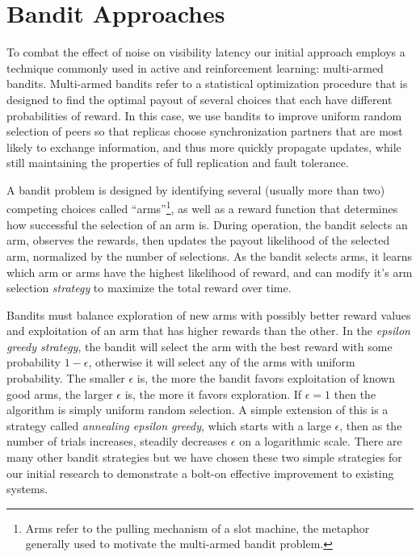 \section{Bandit Approaches}

To combat the effect of noise on visibility latency our initial approach
employs a technique commonly used in active and reinforcement learning:
multi-armed bandits.
Multi-armed bandits refer to a statistical optimization procedure that is
designed to find the optimal payout of several choices that each have
different probabilities of reward.
In this case, we use bandits to improve uniform random selection of peers so
that replicas choose synchronization partners that are most likely to exchange
information, and thus more quickly propagate updates, while still maintaining
the properties of full replication and fault tolerance.

A bandit problem is designed by identifying several (usually more than two)
competing choices called ``arms''\footnote{Arms refer to the pulling
mechanism of a slot machine, the metaphor generally used to motivate the
multi-armed bandit problem.}, as well as a reward function that determines how
successful the selection of an arm is.
During operation, the bandit selects an arm, observes the rewards, then
updates the payout likelihood of the selected arm, normalized by the number
of selections.
As the bandit selects arms, it learns which arm or arms have the highest
likelihood of reward, and can modify it's arm selection \emph{strategy} to
maximize the total reward over time.

Bandits must balance exploration of new arms with possibly better reward
values and exploitation of an arm that has higher rewards than the other.
In the \emph{epsilon greedy strategy}, the bandit will select the arm with
the best reward with some probability $1-\epsilon$, otherwise it will select
any of the arms with uniform probability.
The smaller $\epsilon$ is, the more the bandit favors exploitation of known
good arms, the larger $\epsilon$ is, the more it favors exploration.
If $\epsilon=1$ then the algorithm is simply uniform random selection.
A simple extension of this is a strategy called \emph{annealing epsilon
greedy}, which starts with a large $\epsilon$, then as the number of trials
increases, steadily decreases $\epsilon$ on a logarithmic scale.
There are many other bandit strategies but we have chosen these two simple
strategies for our initial research to demonstrate a bolt-on effective
improvement to existing systems.

